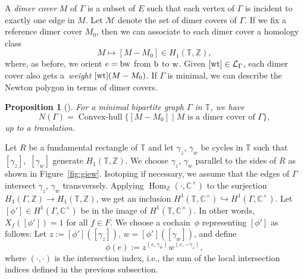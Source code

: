 \documentclass[pdftex]{sigma}
\numberwithin{equation}{section}
\newtheorem{Proposition}[Theorem]{Proposition}
 { \theoremstyle{definition}
\newtheorem{Definition}[Theorem]{Definition}
\newtheorem{Note}[Theorem]{Note}
\newtheorem{Example}[Theorem]{Example}
\newtheorem{Remark}[Theorem]{Remark} }
\newcommand{\Z}{{\mathbb Z}}
\newcommand{\C}{{\mathbb C}}
\newcommand{\T}{{\mathbb T}}
\newcommand{\ra}{\rightarrow}
\newcommand{\w}{{\rm w}}
\newcommand{\bw}{{\rm b}}
\DeclareMathOperator{\Hom}{Hom}
\begin{document}
	
	A \emph{dimer cover} $M$ of $\Gamma$ is a subset of $E$ such that each vertex of $\Gamma$ is incident to exactly one edge in $M$. Let $\mathcal M$ denote the set of dimer covers of $\Gamma$. If we fix a reference dimer cover $M_0$, then we can associate to each dimer cover a homology class
	\[
	M \mapsto [M-M_0] \in H_1(\T,\Z),
	\]
	where, as before, we orient $e=\bw \w$ from ${\rm b}$ to ${\rm w}$. Given $[\rm wt] \in \mathcal L_\Gamma$, each dimer cover also gets a~\emph{weight} $[{\rm wt}](M-M_0)$. If $\Gamma$ is minimal, we can describe the Newton polygon in terms of dimer covers.
	
	\begin{Proposition}
		[]
		For a minimal bipartite graph $\Gamma$ in $\T$, we have
		\[
		N(\Gamma)=\operatorname{Convex-hull}\{[M-M_0] \mid M \text{ is a dimer cover of }\Gamma\},
		\]
		up to a translation.
	\end{Proposition}
	Let $R$ be a fundamental rectangle of $\T$ and let $\gamma_z$, $\gamma_w$ be cycles in $\T$ such that~$[\gamma_z]$,~$[\gamma_w]$ generate $H_1(\T,\Z)$. We choose $\gamma_z$, $\gamma_w$ parallel to the sides of $R$ as shown in Figure~\ref{fig:giew}. Isotoping if necessary, we assume that the edges of $\Gamma$ intersect $\gamma_z$, $\gamma_w$ transversely. Applying $\Hom _\Z(\cdot,\C^\times)$ to the surjection $H_1(\Gamma,\Z) \ra H_1(\T,\Z)$, we get an inclusion $H^1(\T,\C^\times) \hookrightarrow H^1(\Gamma,\C^\times)$. Let~${[\phi'] \in H^1(\Gamma,\C^\times)}$ be in the image of $H^1(\T,\C^\times)$. In other words, $X_f([\phi'])=1$ for all $f \in F$. We choose a cochain~$\phi$ representing $[\phi']$ as follows: Let $z:=[\phi']([\gamma_z])$, $w=[\phi']([\gamma_w])$, and define
	\[
	\phi(e):=z^{(e,\gamma_w)} w^{(e,-\gamma_z)},
	\]
	where $(\cdot,\cdot)$ is the intersection index, i.e., the sum of the local intersection indices defined in the previous subsection.
	
\end{document}
